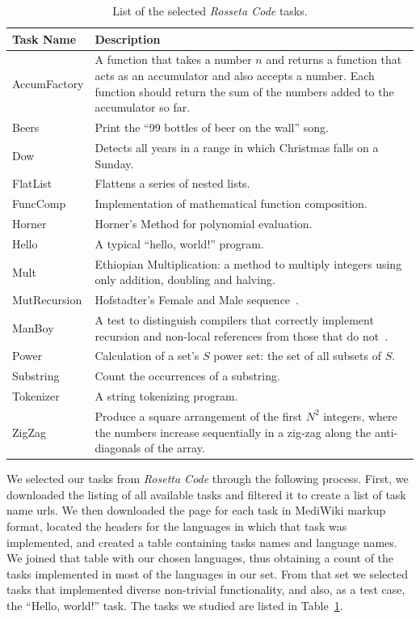 \documentclass[10pt]{sigplanconf}
\begin{document}
\begin{table}
\begin{center}
\begin{tabular}{ l p{5cm}}
Task Name & Description\\
\hline
AccumFactory & A function that takes a number $n$ and returns a function that acts as an accumulator and also accepts a number. Each function should return the sum of the numbers added to the accumulator so far.\\
Beers & Print the ``99 bottles of beer on the wall'' song.\\
Dow & Detects all years in a range in which Christmas falls on a Sunday.\\
FlatList & Flattens a series of nested lists.\\
FuncComp & Implementation of mathematical function composition.\\
Horner & Horner's Method for polynomial evaluation.\\
Hello & A typical ``hello, world!'' program.\\
Mult & Ethiopian Multiplication: a method to multiply integers using only addition, doubling and halving.\\
MutRecursion & Hofstadter's Female and Male sequence~\cite{Hof89}.\\
ManBoy & A test to distinguish compilers that correctly implement
recursion and non-local references from those that do not~\cite{Knu64}.  \\
Power & Calculation of a set's $S$ power set: the set of all subsets of $S$.\\
Substring & Count the occurrences of a substring.\\
Tokenizer & A string tokenizing program.\\
ZigZag & Produce a square arrangement of the first $N^2$ integers,
where the numbers increase sequentially in a zig-zag along the anti-diagonals of the array.\\
\end{tabular}
\end{center}
\caption{List of the selected {\em Rosseta Code} tasks.}
\label{tab:tasks}
\end{table}

We selected our tasks from {\em Rosetta Code} through the following process.
First, we downloaded the listing of all available tasks and
filtered it to create a list of task name {\sc url}s.
We then downloaded the page for each task in MediWiki markup format,
located the headers for the languages in which that task was implemented, and
created a table containing tasks names and language names.
We joined that table with our chosen languages,
thus obtaining a count of the tasks implemented in
most of the languages in our set.
From that set we selected tasks that implemented diverse
non-trivial functionality,
and also, as a test case, the ``Hello, world!'' task.
The tasks we studied are listed in Table~\ref{tab:tasks}.
\end{document}
